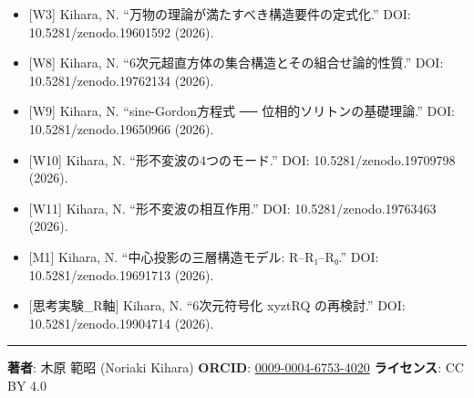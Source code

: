 \documentclass[a4paper,11pt]{ltjsarticle}
\providecommand{\tightlist}{\setlength{\itemsep}{0pt}\setlength{\parskip}{0pt}}
\begin{document}
\begin{itemize}
\tightlist
\item
  {[}W3{]} Kihara, N. ``万物の理論が満たすべき構造要件の定式化.'' DOI:
  10.5281/zenodo.19601592 (2026).
\item
  {[}W8{]} Kihara, N. ``6次元超直方体の集合構造とその組合せ論的性質.''
  DOI: 10.5281/zenodo.19762134 (2026).
\item
  {[}W9{]} Kihara, N. ``sine-Gordon方程式 ── 位相的ソリトンの基礎理論.''
  DOI: 10.5281/zenodo.19650966 (2026).
\item
  {[}W10{]} Kihara, N. ``形不変波の4つのモード.'' DOI:
  10.5281/zenodo.19709798 (2026).
\item
  {[}W11{]} Kihara, N. ``形不変波の相互作用.'' DOI:
  10.5281/zenodo.19763463 (2026).
\item
  {[}M1{]} Kihara, N. ``中心投影の三層構造モデル: R--R₁--R₀.'' DOI:
  10.5281/zenodo.19691713 (2026).
\item
  {[}思考実験\_R軸{]} Kihara, N. ``6次元符号化 xyztRQ の再検討.'' DOI:
  10.5281/zenodo.19904714 (2026).
\end{itemize}

\begin{center}\rule{0.5\linewidth}{0.5pt}\end{center}

\textbf{著者}: 木原 範昭 (Noriaki Kihara) \textbf{ORCID}:
\href{https://orcid.org/0009-0004-6753-4020}{0009-0004-6753-4020}
\textbf{ライセンス}: CC BY 4.0
\end{document}
